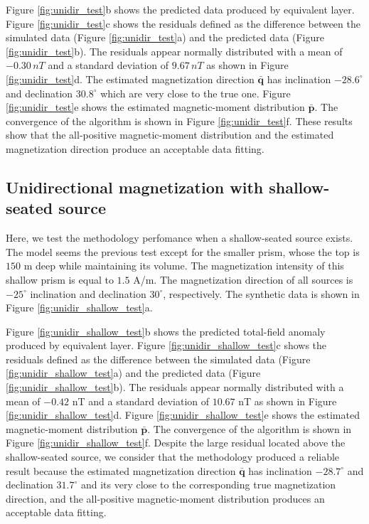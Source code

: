 Figure \ref{fig:unidir_test}b shows the predicted data produced by equivalent layer. 
Figure \ref{fig:unidir_test}c shows the residuals defined as the difference between the simulated data (Figure \ref{fig:unidir_test}a) and the predicted data (Figure \ref{fig:unidir_test}b). The residuals appear normally distributed with a mean of $-0.30 \, nT$ and a standard deviation of $9.67 \, nT$ as shown in Figure \ref{fig:unidir_test}d. The estimated magnetization direction $\bar{\mathbf{q}}$ has inclination $-28.6^\circ$ and declination $30.8^\circ$ which are very close to the true one. Figure \ref{fig:unidir_test}e shows the estimated magnetic-moment distribution $\bar{\mathbf{p}}$. The convergence of the algorithm is shown in Figure \ref{fig:unidir_test}f. These results show that the all-positive magnetic-moment distribution and the estimated magnetization direction produce an acceptable data fitting.

\subsection{Unidirectional magnetization with shallow-seated source}

Here, we test the methodology perfomance when a shallow-seated source exists. The model seems the previous test except for the smaller prism, whose the top is $150$ m deep while maintaining its volume. The magnetization intensity of this shallow prism is equal to $1.5$ A/m. The magnetization direction of all sources is $-25^\circ$ inclination and declination $30^\circ$, respectively. The synthetic data is shown in Figure \ref{fig:unidir_shallow_test}a.

Figure \ref{fig:unidir_shallow_test}b shows the predicted total-field anomaly produced by equivalent layer. Figure \ref{fig:unidir_shallow_test}c shows the residuals defined as the difference between the simulated data (Figure \ref{fig:unidir_shallow_test}a) and the predicted data (Figure \ref{fig:unidir_shallow_test}b). The residuals appear normally distributed with a mean of $-0.42$ nT and a standard deviation of $10.67$ nT as shown in Figure \ref{fig:unidir_shallow_test}d. Figure \ref{fig:unidir_shallow_test}e shows the estimated magnetic-moment distribution $\bar{\mathbf{p}}$. The convergence of the algorithm is shown in Figure \ref{fig:unidir_shallow_test}f. Despite the large residual located above the shallow-seated source, we consider that the methodology produced a reliable result because the estimated magnetization direction $\bar{\mathbf{q}}$ has inclination $-28.7^\circ$ and declination $31.7^\circ$ and its very close to the corresponding true magnetization direction, and the all-positive magnetic-moment distribution produces an acceptable data fitting. 

